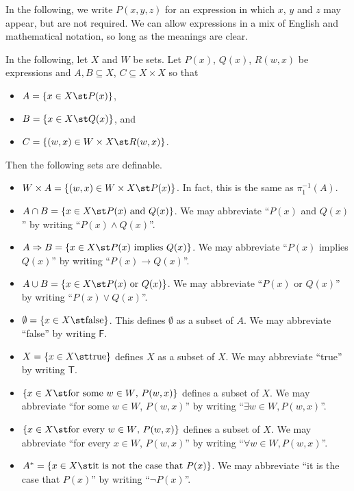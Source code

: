 In the following, we write $P(x,y,z)$ for an expression in which $x$, $y$ and $z$ may appear, but are not required. 
We can allow expressions in a mix of English and mathematical notation, so long as the meanings are clear.

\begin{vocabulary}
	In the following, let $X$ and $W$ be sets. Let $P(x)$, $Q(x)$, $R(w,x)$ be expressions and $A,B\subseteq X$, $C\subseteq X\times X$ so that
	\begin{itemize}
		\item $A = \{x\in X\st P(x)\}$,
		\item $B = \{x\in X\st Q(x)\}$, and
		\item $C = \{(w,x)\in W\times X\st R(w,x)\}$.
	\end{itemize}
Then the following sets are definable. 
\begin{itemize}
\item $W\times A = \{(w,x)\in W\times X\st P(x)\}$. In fact, this is the same 
as $\pi_1^{-1}(A)$.  

\item $A\cap B = \{x\in X\st \text{$P(x)$ and $Q(x)$}\}$. We may abbreviate ``$P(x)$ and $Q(x)$'' by writing ``$P(x)\wedge Q(x)$''. 

\item $A\Rightarrow B = \{x\in X\st \text{$P(x)$ implies $Q(x)$}\}$. We may abbreviate ``$P(x)$ implies $Q(x)$'' by writing ``$P(x)\to Q(x)$''.

\item $A\cup B = \{x\in X\st \text{$P(x)$ or $Q(x)$}\}$. We may abbreviate ``$P(x)$ or $Q(x)$'' by writing ``$P(x)\vee Q(x)$''.
	
\item $\emptyset = \{x\in X\st \text{false} \}$. This defines $\emptyset$ as a subset of $A$. We may abbreviate ``false'' by writing $\textsf{F}$.
	
\item $X = \{x\in X\st \text{true}\}$ defines $X$ as a subset of $X$. We may abbreviate ``true'' by writing $\textsf{T}$.
	
\item $\{x\in X \st \text{for some $w\in W$, $P(w,x)$}\}$ defines a subset of $X$. We may abbreviate ``for some $w\in W$, $P(w,x)$'' by writing ``$\exists w\in W, P(w,x)$''.
	
\item $\{x\in X \st \text{for every $w\in W$, $P(w,x)$}\}$ defines a subset of $X$.  We may abbreviate ``for every $x\in W$, $P(w,x)$'' by writing ``$\forall w\in W, P(w,x)$''.

\item $A^* = \{x\in X\st \text{it is not the case that $P(x)$}\}$.  We may abbreviate ``it is the case that $P(x)$'' by writing ``$\neg P(x)$''.
\end{itemize}
\end{vocabulary}

